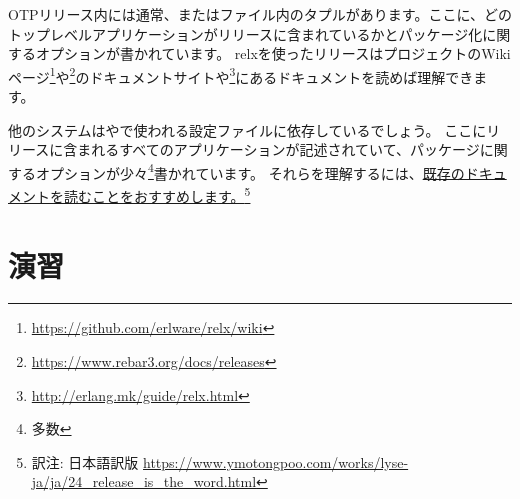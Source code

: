OTPリリース内には通常、またはファイル内のタプルがあります。ここに、どのトップレベルアプリケーションがリリースに含まれているかとパッケージ化に関するオプションが書かれています。
relxを使ったリリースはプロジェクトのWikiページ\footnote{\href{https://github.com/erlware/relx/wiki}{https://github.com/erlware/relx/wiki}}や\footnote{\href{https://www.rebar3.org/docs/releases}{https://www.rebar3.org/docs/releases}}のドキュメントサイトや\footnote{\href{http://erlang.mk/guide/relx.html}{http://erlang.mk/guide/relx.html}}にあるドキュメントを読めば理解できます。

他のシステムはやで使われる設定ファイルに依存しているでしょう。
ここにリリースに含まれるすべてのアプリケーションが記述されていて、パッケージに関するオプションが少々\footnote{多数}書かれています。
それらを理解するには、\href{http://learnyousomeerlang.com/release-is-the-word}{既存のドキュメントを読むことをおすすめします。}\footnote{訳注: 日本語訳版 \href{https://www.ymotongpoo.com/works/lyse-ja/ja/24\_release\_is\_the\_word.html}{https://www.ymotongpoo.com/works/lyse-ja/ja/24\_release\_is\_the\_word.html}}

\section{演習}

